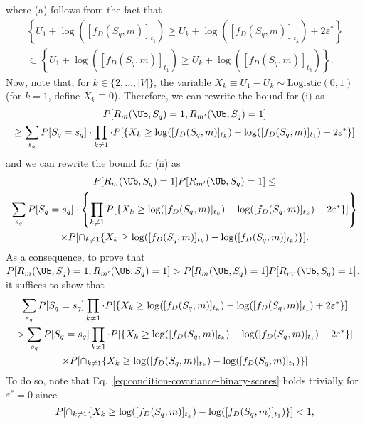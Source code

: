 where (a) follows from the fact that
%
\begin{multline*}
      \left\{ U_1 + \log ( [f_D(S_q,m)]_{t_1} ) \geq U_k + \log ( [f_D(S_q,m)]_{t_k} ) +2\varepsilon^* \right\} \\
      \subset \left\{ U_1 + \log ( [f_D(S_q,m)]_{t_1} ) \geq U_k + \log ( [f_D(S_q,m)]_{t_k} ) \right\}.
\end{multline*}
%
Now, note that, for $k \in \{2, \ldots, |V|\}$, the variable $X_k \equiv U_1-U_k \sim \text{Logistic}(0,1)$ (for $k=1$, define $X_k \equiv 0$). 
%
Therefore, we can rewrite the bound for (i) as
%  
\begin{multline*}
      \PP[R_m(\Ub,S_q)=1, R_{m'}(\Ub,S_q)=1]\\
      \geq\sum_{s_q} \PP[S_q=s_q] \cdot \prod_{k\neq1}\cdot \PP[ \{ X_k \geq \log ( [f_D(S_q,m)]_{t_k} )-\log ( [f_D(S_q,m)]_{t_1} ) +2\varepsilon^* \}]
\end{multline*}
%
and we can rewrite the bound for (ii) as
%
\begin{multline*}
    \PP[R_m(\Ub,S_q)=1] \PP[R_{m'}(\Ub,S_q)=1]\leq \\
    \sum_{s_q}\PP[S_q=s_q]\cdot 
            \left\{
            \prod_{k\neq1}
            \PP[ \{ X_k \geq \log ( [f_D(S_q,m)]_{t_k} )-\log ( [f_D(S_q,m)]_{t_k} ) - 2\varepsilon^* \} ]
            \right\}\\
            \times \PP[\cap_{k\neq1} \{X_k \geq \log ( [f_D(S_q,m)]_{t_k} )-\log ( [f_D(S_q,m)]_{t_k} )\}].
\end{multline*}
%
As a consequence, to prove that $\PP[R_m(\Ub,S_q)=1, R_{m'}(\Ub,S_q)=1] > \PP[R_m(\Ub,S_q)=1] \PP[R_{m'}(\Ub,S_q)=1]$, it suffices to show that
    \begin{multline}\label{eq:condition-covariance-binary-scores}
            \sum_{s_q}P[S_q=s_q] \prod_{k\neq1}\cdot P[ \{ X_k \geq \log ( [f_D(S_q,m)]_{t_k} )-\log ( [f_D(S_q,m)]_{t_1} ) +2\varepsilon^* \}]\\
            > \sum_{s_q}P[S_q=s_q] \prod_{k\neq1}\cdot P[ \{ X_k \geq \log ( [f_D(S_q,m)]_{t_k} )-\log ( [f_D(S_q,m)]_{t_1} ) - 2\varepsilon^* \}]
            \\
            \times P[\cap_{k\neq1} \{X_k \geq \log ( [f_D(S_q,m)]_{t_k} )-\log ( [f_D(S_q,m)]_{t_1} )\}]
    \end{multline}
%
To do so, note that Eq.~\ref{eq:condition-covariance-binary-scores} holds trivially for $\varepsilon^*=0$ since
%
\begin{equation*}
      P[\cap_{k\neq1} \{X_k \geq \log ( [f_D(S_q,m)]_{t_k} )-\log ( [f_D(S_q,m)]_{t_1} )\}] < 1,
\end{equation*}
